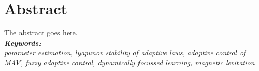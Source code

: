 \newpage
{}
\chapter*{Abstract}
\label{chap:abs}
{
\normalsize
The abstract goes here.\\
\textit{\textbf{Keywords:\\}parameter estimation, lyapunov stability of adaptive laws, adaptive control of MAV, fuzzy adaptive control, dynamically focussed learning, magnetic levitation}
}
